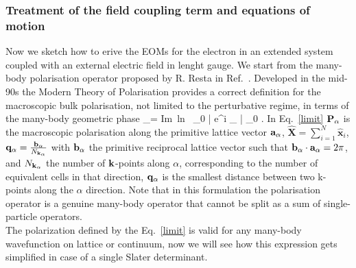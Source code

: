\subsubsection{Treatment of the field coupling term and equations of motion}\label{ss:fldcpl}
Now we sketch how to erive the EOMs for the electron in an extended system coupled with an external electric field in lenght gauge. We start from the many-body polarisation operator proposed by R. Resta in Ref.~\cite{PhysRevLett.80.1800}.
Developed in the mid-90s the Modern Theory of Polarisation\cite{RevModPhys.66.899} provides a correct definition for the macroscopic bulk polarisation, not limited to the perturbative regime, in terms of the many-body geometric phase 
\be 
\PP_\alpha =   \mbox{Im ln }  \langle \Psi_0 | {\rm e}^{i \qq_\alpha \cdot {}} | \Psi_0 \rangle . \label{limit} 
\ee
In Eq.~\eqref{limit} ${\bf P}_\alpha$ is the macroscopic polarisation along the primitive lattice vector ${\bf a}_\alpha$, $\hat{\mathbf X} = \sum_{i=1}^{N} \hat{\mathbf x}_i$, ${\bf q}_\alpha = \frac{{\bf b}_\alpha}{N_{{\bf k}_\alpha}}$ with ${\bf b}_\alpha$ the primitive reciprocal lattice vector such that ${\bf b}_\alpha\cdot{\bf a}_\alpha=2\pi$, and $N_{{\bf k}_\alpha}$ the number of ${\bf k}$-points along $\alpha$, corresponding to the number of equivalent cells in that direction, ${\bf q}_\alpha$ is the smallest distance between two k-points along the $\alpha$ direction.
Note that in this formulation the polarisation operator is a genuine many-body operator that cannot be split as a sum of single-particle operators. \\
The polarization defined by the Eq.~\ref{limit} is valid for any many-body wavefunction on lattice or continuum\cite{PhysRevLett.80.1800,resta1999electron}, now we will see how this expression gets simplified in case of a single Slater determinant.



